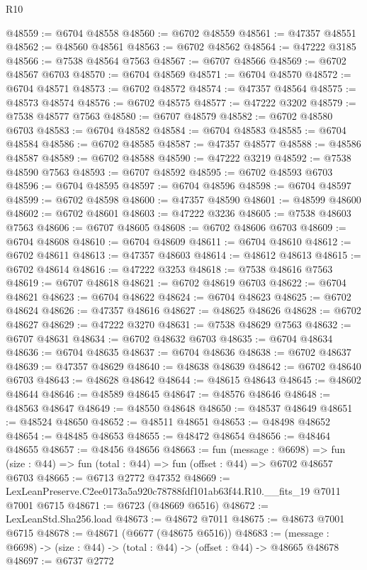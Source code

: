 \begin{lexlean}{R10}
\begin{coremodule}
@48559 := @6704 @48558
@48560 := @6702 @48559
@48561 := @47357 @48551
@48562 := @48560 @48561
@48563 := @6702 @48562
@48564 := @47222 @3185
@48566 := @7538 @48564 @7563
@48567 := @6707 @48566
@48569 := @6702 @48567 @6703
@48570 := @6704 @48569
@48571 := @6704 @48570
@48572 := @6704 @48571
@48573 := @6702 @48572
@48574 := @47357 @48564
@48575 := @48573 @48574
@48576 := @6702 @48575
@48577 := @47222 @3202
@48579 := @7538 @48577 @7563
@48580 := @6707 @48579
@48582 := @6702 @48580 @6703
@48583 := @6704 @48582
@48584 := @6704 @48583
@48585 := @6704 @48584
@48586 := @6702 @48585
@48587 := @47357 @48577
@48588 := @48586 @48587
@48589 := @6702 @48588
@48590 := @47222 @3219
@48592 := @7538 @48590 @7563
@48593 := @6707 @48592
@48595 := @6702 @48593 @6703
@48596 := @6704 @48595
@48597 := @6704 @48596
@48598 := @6704 @48597
@48599 := @6702 @48598
@48600 := @47357 @48590
@48601 := @48599 @48600
@48602 := @6702 @48601
@48603 := @47222 @3236
@48605 := @7538 @48603 @7563
@48606 := @6707 @48605
@48608 := @6702 @48606 @6703
@48609 := @6704 @48608
@48610 := @6704 @48609
@48611 := @6704 @48610
@48612 := @6702 @48611
@48613 := @47357 @48603
@48614 := @48612 @48613
@48615 := @6702 @48614
@48616 := @47222 @3253
@48618 := @7538 @48616 @7563
@48619 := @6707 @48618
@48621 := @6702 @48619 @6703
@48622 := @6704 @48621
@48623 := @6704 @48622
@48624 := @6704 @48623
@48625 := @6702 @48624
@48626 := @47357 @48616
@48627 := @48625 @48626
@48628 := @6702 @48627
@48629 := @47222 @3270
@48631 := @7538 @48629 @7563
@48632 := @6707 @48631
@48634 := @6702 @48632 @6703
@48635 := @6704 @48634
@48636 := @6704 @48635
@48637 := @6704 @48636
@48638 := @6702 @48637
@48639 := @47357 @48629
@48640 := @48638 @48639
@48642 := @6702 @48640 @6703
@48643 := @48628 @48642
@48644 := @48615 @48643
@48645 := @48602 @48644
@48646 := @48589 @48645
@48647 := @48576 @48646
@48648 := @48563 @48647
@48649 := @48550 @48648
@48650 := @48537 @48649
@48651 := @48524 @48650
@48652 := @48511 @48651
@48653 := @48498 @48652
@48654 := @48485 @48653
@48655 := @48472 @48654
@48656 := @48464 @48655
@48657 := @48456 @48656
@48663 := fun (message : @6698) =>
  fun (size : @44) => fun (total : @44) => fun (offset : @44) => @6702 @48657 @6703
@48665 := @6713 @2772 @47352
@48669 := LexLeanPreserve.C2ee0173a5a920c78788fdf101ab63f44.R10.__fits_19 @7011 @7001 @6715
@48671 := @6723 (@48669 @6516)
@48672 := LexLeanStd.Sha256.load
@48673 := @48672 @7011
@48675 := @48673 @7001 @6715
@48678 := @48671 (@6677 (@48675 @6516))
@48683 := (message : @6698) -> (size : @44) -> (total : @44) -> (offset : @44) -> @48665 @48678
@48697 := @6737
    @2772

\end{coremodule}
\end{lexlean}
